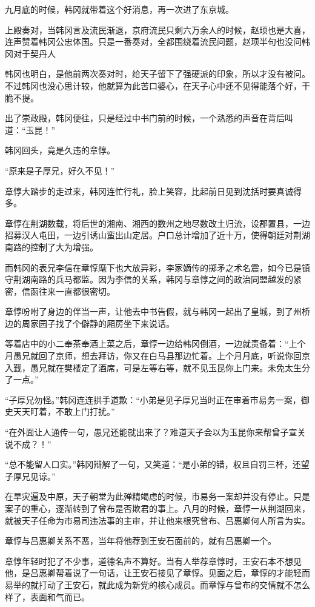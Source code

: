九月底的时候，韩冈就带着这个好消息，再一次进了东京城。

上殿奏对，当韩冈言及流民渐退，京府流民只剩六万余人的时候，赵顼也是大喜，连声赞着韩冈公忠体国。只是一番奏对，全都围绕着流民问题，赵顼半句也没问韩冈对于契丹人

韩冈也明白，是他前两次奏对时，给天子留下了强硬派的印象，所以才没有被问。不过韩冈也没心思计较，他就算为此苦口婆心，在天子心中还不见得能落个好，干脆不提。

出了崇政殿，韩冈便往，只是经过中书门前的时候，一个熟悉的声音在背后叫道：“玉昆！”

韩冈回头，竟是久违的章惇。

“原来是子厚兄，好久不见！”

章惇大踏步的走过来，韩冈连忙行礼，脸上笑容，比起前日见到沈括时要真诚得多。

章惇在荆湖数载，将后世的湘南、湘西的数州之地尽数改土归流，设郡置县，一边招募汉人屯田，一边引诱山蛮出山定居。户口总计增加了近十万，使得朝廷对荆湖南路的控制了大为增强。

而韩冈的表兄李信在章惇麾下也大放异彩，李家嫡传的掷矛之术名震，如今已是镇守荆湖南路的兵马都监。因为李信的关系，韩冈与章惇之间的政治同盟越发的紧密，信函往来一直都很密切。

章惇吩咐了身边的伴当一声，让他去中书告假，就与韩冈一起出了皇城，到了州桥边的周家园子找了个僻静的厢房坐下来说话。

等着店中的小二奉茶奉酒上菜之后，章惇一边给韩冈倒酒，一边就责备着：“上个月愚兄就回了京师，想去拜访，你又在白马县那边忙着。上个月月底，听说你回京入觐，愚兄就在樊楼定了酒席，可是左等右等，就不见玉昆你上门来。未免太生分了一点。”

“子厚兄勿怪。”韩冈连连拱手道歉：“小弟是见子厚兄当时正在审着市易务一案，御史天天盯着，不敢上门打扰。”

“在外面让人通传一句，愚兄还能就出来了？难道天子会以为玉昆你来帮曾子宣关说不成？！”

“总不能留人口实。”韩冈辩解了一句，又笑道：“是小弟的错，权且自罚三杯，还望子厚兄见谅。”

在旱灾遍及中原，天子朝堂为此殚精竭虑的时候，市易务一案却并没有停止。只是案子的重心，逐渐转到了曾布是否欺君的事上。八月的时候，章惇一从荆湖回来，就被天子任命为市易司违法事的主审，并让他来根究曾布、吕惠卿何人所言为实。

章惇与吕惠卿关系不恶，当年将他荐到王安石面前的，就有吕惠卿一个。

章惇年轻时犯了不少事，道德名声不算好。当有人举荐章惇时，王安石本不想见他，是吕惠卿帮着说了一句话，让王安石接见了章惇。见面之后，章惇的才能轻而易举的就打动了王安石，就此成为新党的核心成员。而章惇与曾布的交情就不怎么样了，表面和气而已。

